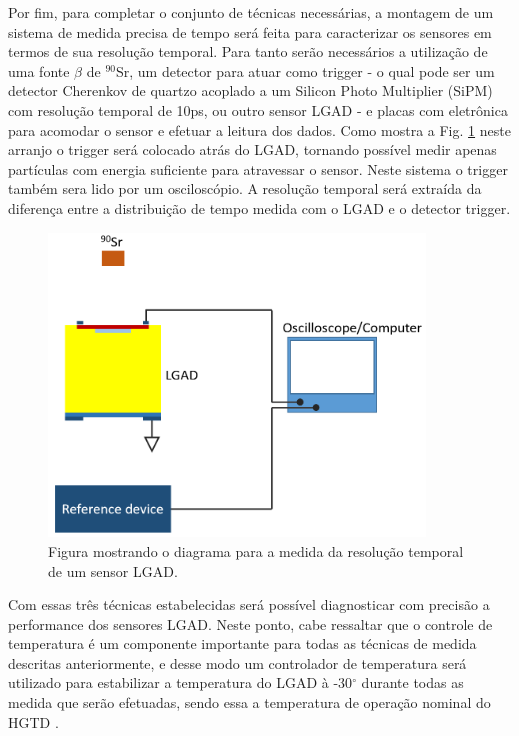 Por fim, para completar o conjunto de técnicas necessárias, a montagem de um sistema de medida precisa de tempo será feita para caracterizar os sensores em termos de sua resolução temporal. Para tanto serão necessários a utilização de uma fonte $\beta$ de $^{90}$Sr, um detector para atuar como trigger - o qual pode ser um detector Cherenkov de quartzo acoplado a um Silicon Photo Multiplier (SiPM) com resolução temporal de 10ps, ou outro sensor LGAD - e placas com eletrônica para acomodar o sensor e efetuar a leitura dos dados. Como mostra a Fig. \ref{setup2} neste arranjo o trigger será colocado atrás do LGAD, tornando possível medir apenas partículas com energia suficiente para atravessar o sensor. Neste sistema o trigger também sera lido por um osciloscópio. A resolução temporal será extraída da diferença entre a distribuição de tempo medida com o LGAD e o detector trigger.

\begin{figure}
    \centering
    \includegraphics[width=10.0cm]{assets/time.png}
    \caption{Figura mostrando o diagrama para a medida da resolução temporal de um sensor LGAD.}
    \label{setup2}
\end{figure}

Com essas três técnicas estabelecidas será possível diagnosticar com precisão a performance dos sensores LGAD. Neste ponto, cabe ressaltar que o controle de temperatura é um componente importante para todas as técnicas de medida descritas anteriormente, e desse modo um controlador de temperatura será utilizado para estabilizar a temperatura do LGAD à -30$^{\circ}$ durante todas as medida que serão efetuadas, sendo essa a temperatura de operação nominal do HGTD \cite{tdr}.

